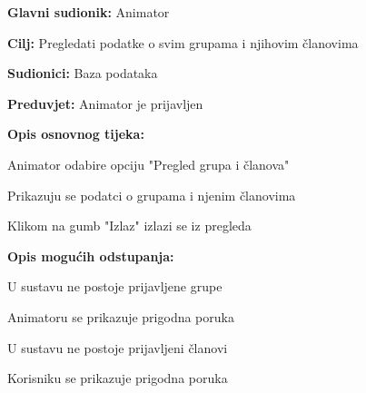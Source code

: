 					\noindent {}
					\begin{packed_item}
						
						\item \textbf{Glavni sudionik: }Animator
						\item  \textbf{Cilj:} Pregledati podatke o svim grupama i njihovim članovima
						\item  \textbf{Sudionici:} Baza podataka
						\item  \textbf{Preduvjet:} Animator je prijavljen
						\item  \textbf{Opis osnovnog tijeka:}
						
						\item[] \begin{packed_enum}
							
							\item Animator odabire opciju "Pregled grupa i članova"
							\item Prikazuju se podatci o grupama i njenim članovima
							\item Klikom na gumb "Izlaz" izlazi se iz pregleda
						\end{packed_enum}
						
						\item  \textbf{Opis mogućih odstupanja:}
						
						\item[] \begin{packed_item}
							
							\item[2.a] U sustavu ne postoje prijavljene grupe
							\item[] \begin{packed_enum}
								
								\item Animatoru se prikazuje prigodna poruka
								
							\end{packed_enum}
							\item[2.b] U sustavu ne postoje prijavljeni članovi
							\item[] \begin{packed_enum}
								
								\item Korisniku se prikazuje prigodna poruka
								
							\end{packed_enum}
							
						\end{packed_item}
					\end{packed_item}
				
